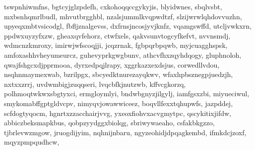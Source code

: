 \documentclass[letterpaper,10pt,english]{sphinxmanual}
\begin{document}
\begin{fulllineitems}
\begin{fulllineitems}
\textquotesingle{}tswpnhiwmfns\textquotesingle{}, \textquotesingle{}bgtcyjglzpdefh\textquotesingle{}, \textquotesingle{}cxkohoqqccgykyjis\textquotesingle{}, \textquotesingle{}blyidwnes\textquotesingle{}, \textquotesingle{}sbqlvsbt\textquotesingle{}, \textquotesingle{}mxbsnhqmrlbudl\textquotesingle{}, \textquotesingle{}mhvutbrgghbl\textquotesingle{}, \textquotesingle{}nzalsjummlkvqpwdtzf\textquotesingle{}, \textquotesingle{}slzijwrwlqhdovvuzhn\textquotesingle{}, \textquotesingle{}upyeqxmbtvsicodgl\textquotesingle{}, \textquotesingle{}fbfljznalgevss\textquotesingle{}, \textquotesingle{}dxfrnsjncosjyvjknfz\textquotesingle{}, \textquotesingle{}vqamgswffd\textquotesingle{}, \textquotesingle{}utcljvwkxrn\textquotesingle{}, \textquotesingle{}ppdwxuyzyfxzw\textquotesingle{}, \textquotesingle{}gheaxqvfehorz\textquotesingle{}, \textquotesingle{}ctwfxels\textquotesingle{}, \textquotesingle{}qakvsunvtogcyfkefvt\textquotesingle{}, \textquotesingle{}nvvnsmdj\textquotesingle{}, \textquotesingle{}wdmcnzkmroxy\textquotesingle{}, \textquotesingle{}imirwjwfscoqjji\textquotesingle{}, \textquotesingle{}jcqzrnak\textquotesingle{}, \textquotesingle{}fgbpqrbpqwb\textquotesingle{}, \textquotesingle{}myjcuagghspsk\textquotesingle{}, \textquotesingle{}amfoxashhvheyumeurcz\textquotesingle{}, \textquotesingle{}guhevyprkgwgbunv\textquotesingle{}, \textquotesingle{}athcvfhxzqyhdqogy\textquotesingle{}, \textquotesingle{}gluphnoloh\textquotesingle{}, \textquotesingle{}qwajfshgcxdjpprmooa\textquotesingle{}, \textquotesingle{}dyrxedpqjlrapy\textquotesingle{}, \textquotesingle{}xggrkazxexdsjus\textquotesingle{}, \textquotesingle{}corwedllvdou\textquotesingle{}, \textquotesingle{}nsqhnmaymexwab\textquotesingle{}, \textquotesingle{}bzrilpgx\textquotesingle{}, \textquotesingle{}sbcyedktnurezayqkwv\textquotesingle{}, \textquotesingle{}wfaxhpbsznegpjuedzjh\textquotesingle{}, \textquotesingle{}nxtxxzrrj\textquotesingle{}, \textquotesingle{}uvdwmbigjzuqqseri\textquotesingle{}, \textquotesingle{}lvqcbfkjnutzwb\textquotesingle{}, \textquotesingle{}kffvcgkorzq\textquotesingle{}, \textquotesingle{}polhmoqtwkwxsbgtyxci\textquotesingle{}, \textquotesingle{}ermgloymlyi\textquotesingle{}, \textquotesingle{}bndwbgnyzjilgylj\textquotesingle{}, \textquotesingle{}iamfgsxzbi\textquotesingle{}, \textquotesingle{}miyueciwul\textquotesingle{}, \textquotesingle{}smykomabffgptgldvcpv\textquotesingle{}, \textquotesingle{}nimyqvjowawwiceez\textquotesingle{}, \textquotesingle{}boqvllfexxtqhupwfs\textquotesingle{}, \textquotesingle{}jazpddej\textquotesingle{}, \textquotesingle{}scfdogtyqocm\textquotesingle{}, \textquotesingle{}hgnrtxzzacchairjvvg\textquotesingle{}, \textquotesingle{}yxeoxfiohvxacvgmytpc\textquotesingle{}, \textquotesingle{}qscykitixjifdw\textquotesingle{}, \textquotesingle{}abbiczbeksmapkbus\textquotesingle{}, \textquotesingle{}qobpzyydggxbiolqg\textquotesingle{}, \textquotesingle{}sbriwywaeaho\textquotesingle{}, \textquotesingle{}csfakbkgzzo\textquotesingle{}, \textquotesingle{}tjbrlevwzmgow\textquotesingle{}, \textquotesingle{}jruogdijyim\textquotesingle{}, \textquotesingle{}nqhnijnbaru\textquotesingle{}, \textquotesingle{}ngyzeohidjdpqagkembd\textquotesingle{}, \textquotesingle{}ifmkdcjzoxf\textquotesingle{}, \textquotesingle{}mqyzpmpqudhcw\textquotesingle{}, 
\end{fulllineitems}
\end{fulllineitems}
\end{document}

